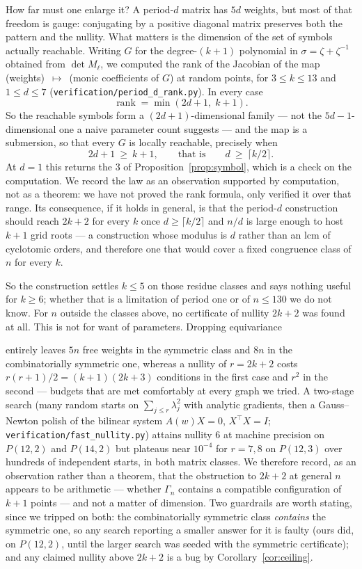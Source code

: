 \documentclass[11pt]{article}
\theoremstyle{definition}
\begin{document}
How far must one enlarge it? A period-$d$ matrix has $5d$ weights, but most of
that freedom is gauge: conjugating by a positive diagonal matrix preserves both
the pattern and the nullity. What matters is the dimension of the set of
symbols actually reachable. Writing $G$ for the degree-$(k+1)$ polynomial in
$\sigma=\zeta+\zeta^{-1}$ obtained from $\det M_\ell$, we computed the rank of
the Jacobian of the map (weights)~$\mapsto$~(monic coefficients of $G$) at
random points, for $3\le k\le13$ and $1\le d\le7$
(\texttt{verification/period\_d\_rank.py}). In every case
\[
  \operatorname{rank}=\min(2d+1,\;k+1).
\]
So the reachable symbols form a $(2d+1)$-dimensional family --- not the
$5d-1$-dimensional one a naive parameter count suggests --- and the map is a
submersion, so that every $G$ is locally reachable, precisely when
\[
  2d+1\ \ge\ k+1,\qquad\text{that is}\qquad d\ \ge\ \lceil k/2\rceil .
\]
At $d=1$ this returns the $3$ of Proposition~\ref{prop:symbol}, which is a
check on the computation. We record the law as an observation supported by
computation, not as a theorem: we have not proved the rank formula, only
verified it over that range. Its consequence, if it holds in general, is that
the period-$d$ construction should reach $2k+2$ for every $k$ once
$d\ge\lceil k/2\rceil$ and $n/d$ is large enough to host $k+1$ grid roots ---
a construction whose modulus is $d$ rather than an lcm of cyclotomic orders,
and therefore one that would cover a fixed congruence class of $n$ for every
$k$.

\noindent
So the construction settles $k\le5$ on those residue classes and says nothing
useful for $k\ge6$; whether that is a limitation of period one or of $n\le130$
we do not know. For $n$ outside the classes above, no certificate of nullity
$2k+2$ was found at all.
This is not for want of parameters. Dropping equivariance

entirely leaves $5n$ free weights in the symmetric class and $8n$ in the
combinatorially symmetric one, whereas a nullity of $r=2k+2$ costs
$r(r+1)/2=(k+1)(2k+3)$ conditions in the first case and $r^{2}$ in the second
--- budgets that are met comfortably at every graph we tried. A two-stage search
(many random starts on $\sum_{j\le r}\lambda_j^{2}$ with analytic gradients,
then a Gauss--Newton polish of the bilinear system $A(w)X=0$, $X^{\!\top}X=I$;
\texttt{verification/fast\_nullity.py}) attains nullity $6$ at machine
precision on $P(12,2)$ and $P(14,2)$ but plateaus near $10^{-4}$ for
$r=7,8$ on $P(12,3)$ over hundreds of independent starts, in both matrix
classes. We therefore record, as an observation rather than a theorem, that
the obstruction to $2k+2$ at general $n$ appears to be arithmetic --- whether
$\Gamma_n$ contains a compatible configuration of $k+1$ points --- and not a
matter of dimension. Two guardrails are worth stating, since we tripped on
both: the combinatorially symmetric class \emph{contains} the symmetric one,
so any search reporting a smaller answer for it is faulty (ours did, on
$P(12,2)$, until the larger search was seeded with the symmetric certificate);
and any claimed nullity above $2k+2$ is a bug by
Corollary~\ref{cor:ceiling}.
\end{document}
